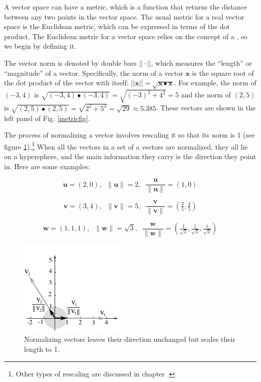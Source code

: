    A vector space can have a metric, which is a function that returns the 
distance between any two points in the vector space. The usual metric for a 
real vector space is the Euclidean metric, which can be expressed in terms of 
the dot product. The Euclidean metric for a vector space relies on the concept of a , so we begin by defining it.

The vector norm is denoted by double bars $|| \cdot ||$, which measures the ``length'' or 
``magnitude'' of a vector. Specifically, the norm of a vector $\mathbf{x}$ is 
the square root of the dot product of the vector with itself: $||\mathbf{x}|| = 
\sqrt{\mathbf{x} \bullet \mathbf{x}}$. For example, the norm of $(-3,4)$ is $\sqrt{(-3,4) \bullet (-3,4)}  = \sqrt{(-3)^2+4^2} = 5$ and the norm 
of $(2,5)$ is $ \sqrt{(2,5) \bullet (2,5)} = \sqrt{2^2+5^2} =  \sqrt{29} \approx 5.385$. These vectors are 
shown in the left panel of Fig. \ref{metricfig}. 

The process of normalizing a vector involves rescaling it so that its norm is 1 (see figure \ref{normalizeVectors}).\footnote{Other types of rescaling are discussed in chapter .} When all the vectors in a set of a vectors are normalized, they all lie on a hypersphere, and the main information they carry is the direction they point in. Here are some examples:
\begin{description}
\item $$\textbf{u} = (2,0), \;\; \|\textbf{u}\| = 2, \;\; 
\frac{\textbf{u}}{\|\textbf{u}\|} = (1,0)$$
\item $$\textbf{v} = (3,4), \;\; \|\textbf{v}\| = 5, \;\; 
\frac{\textbf{v}}{\|\textbf{v}\|} = \left(\tfrac{3}{5}, \tfrac{4}{5}\right)$$
\item $$\textbf{w} = (1,1,1), \;\; \|\textbf{w}\| = \sqrt{3}, \;\; 
\frac{\textbf{w}}{\|\textbf{w}\|} = \left(\tfrac{1}{\sqrt{3}}, \tfrac{1}{\sqrt{3}}, \tfrac{1}{\sqrt{3}}\right)$$
\end{description}

\begin{figure}[h]
\centering
\includegraphics[scale=1.5]{./images/normalizingVectors.pdf}
\caption[Scott Hotton.]{Normalizing vectors leaves their direction unchanged but scales their length to 1.}
\label{normalizeVectors}
\end{figure}


